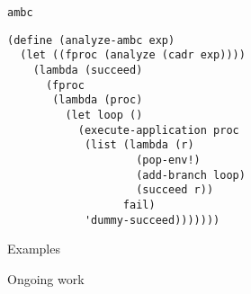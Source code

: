 \documentclass[14pt]{beamer}
\begin{document}
\begin{frame}[fragile]{\texttt{ambc}}
  \begin{lstlisting}
(define (analyze-ambc exp)
  (let ((fproc (analyze (cadr exp))))
    (lambda (succeed)
      (fproc
       (lambda (proc)
         (let loop ()     
           (execute-application proc
            (list (lambda (r)
                    (pop-env!)
                    (add-branch loop)
                    (succeed r))
                  fail)
            'dummy-succeed)))))))
  \end{lstlisting}
\end{frame}

\begin{frame}{Examples}
  
\end{frame}

\begin{frame}{Ongoing work}
  
\end{frame}
\end{document}
